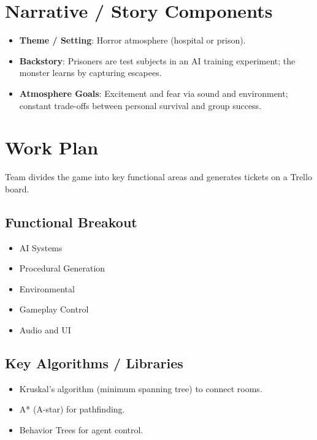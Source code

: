 \documentclass[11pt]{article}
\begin{document}
\section{Narrative / Story Components}
\begin{itemize}
  \item \textbf{Theme / Setting}: Horror atmosphere (hospital or prison).
  \item \textbf{Backstory}: Prisoners are test subjects in an AI training experiment; the monster learns by capturing escapees.
  \item \textbf{Atmosphere Goals}: Excitement and fear via sound and environment; constant trade-offs between personal survival and group success.
\end{itemize}

\section{Work Plan}
Team divides the game into key functional areas and generates tickets on a Trello board.

\subsection*{Functional Breakout}
\begin{itemize}
  \item AI Systems
  \item Procedural Generation
  \item Environmental
  \item Gameplay Control
  \item Audio and UI
\end{itemize}

\subsection*{Key Algorithms / Libraries}
\begin{itemize}
  \item Kruskal's algorithm (minimum spanning tree) to connect rooms.
  \item A* (A-star) for pathfinding.
  \item Behavior Trees for agent control.
\end{itemize}
\end{document}
